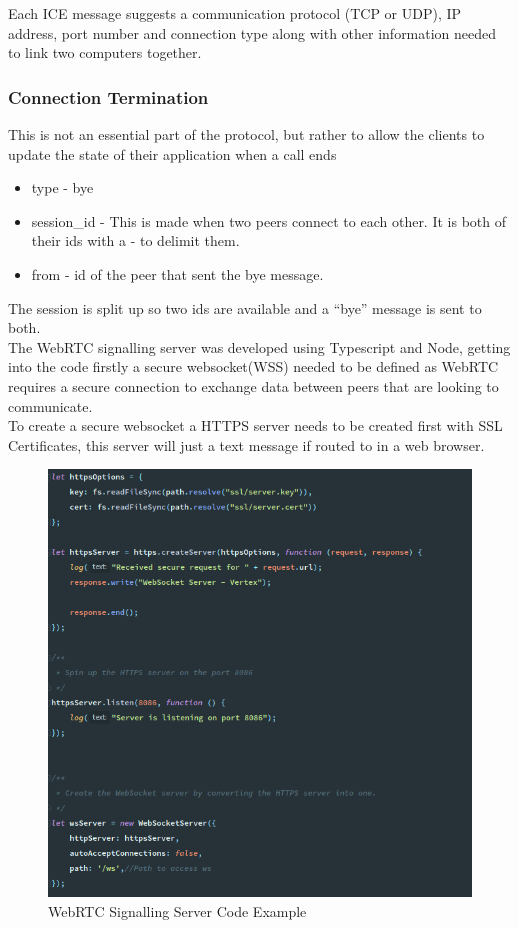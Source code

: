 Each ICE message suggests a communication protocol (TCP or UDP), IP address, port number and connection type along with other information needed to link two computers together.

\subsubsection {Connection Termination}
This is not an essential part of the protocol, but rather to allow the clients to update the state of their application when a call ends
\begin{itemize}
    \item type - bye
    \item session\_id - This is made when two peers connect to each other. It is both of their ids with a - to delimit them.
    \item from - id of the peer that sent the bye message.
\end{itemize}

The session is split up so two ids are available and a “bye” message is sent to both.
\\ The WebRTC signalling server was developed using Typescript and Node, getting into the code firstly a secure websocket(WSS) needed to be defined as WebRTC requires a secure connection to exchange data between peers that are looking to communicate. 
\\ To create a secure websocket a HTTPS server needs to be created first with SSL
Certificates, this server will just a text message if routed to in a web browser. 

\begin{figure}[h!]
    \caption{WebRTC Signalling Server Code Example}
    \label{image:webRTCSigServCode}
    \centering
    \includegraphics[width=1.0\textwidth]{images/webrtc_signalling_server_code.png}
\end{figure}

